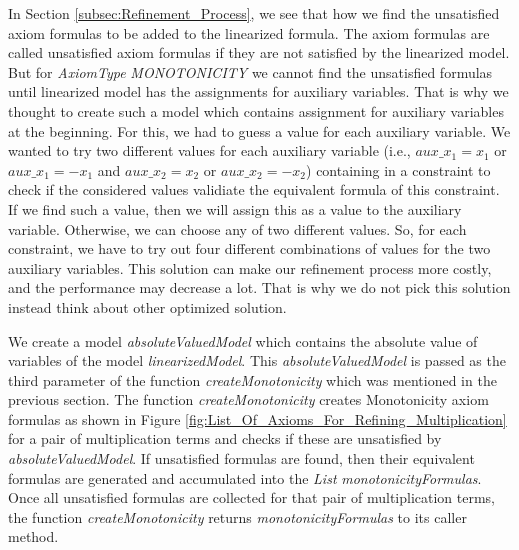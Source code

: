 \noindent In Section \ref{subsec:Refinement_Process}, we see that how we find the unsatisfied axiom formulas to be added to the linearized formula.
The axiom formulas are called unsatisfied axiom formulas if they are not satisfied by the linearized model.
But for \textit{AxiomType} \textit{MONOTONICITY} we cannot find the unsatisfied formulas until linearized model has the assignments for auxiliary variables.
That is why we thought to create such a model which contains assignment for auxiliary variables at the beginning.
For this, we had to guess a value for each auxiliary variable.
We wanted to try two different values for each auxiliary variable (i.e., $aux\_x_{1} = x_{1}$ or $aux\_x_{1} = -x_{1}$ and $aux\_x_{2} = x_{2}$ or $aux\_x_{2} = -x_{2}$) containing in a constraint to check if the considered values validiate the equivalent formula of this constraint.
If we find such a value, then we will assign this as a value to the auxiliary variable.
Otherwise, we can choose any of two different values.
So, for each constraint, we have to try out four different combinations of values for the two auxiliary variables.
This solution can make our refinement process more costly, and the performance may decrease a lot.
That is why we do not pick this solution instead think about other optimized solution.\newline

\noindent We create a model \textit{absoluteValuedModel} which contains the absolute value of variables of the model \textit{linearizedModel}.
This \textit{absoluteValuedModel} is passed as the third parameter of the function \textit{createMonotonicity} which was mentioned in the previous section.
The function \textit{createMonotonicity} creates Monotonicity axiom formulas as shown in Figure \ref{fig:List_Of_Axioms_For_Refining_Multiplication} for a pair of multiplication terms and checks if these are unsatisfied by \textit{absoluteValuedModel}.
If unsatisfied formulas are found, then their equivalent formulas are generated and accumulated into the \textit{List} \textit{monotonicityFormulas}.
Once all unsatisfied formulas are collected for that pair of multiplication terms, the function \textit{createMonotonicity} returns \textit{monotonicityFormulas} to its caller method.

